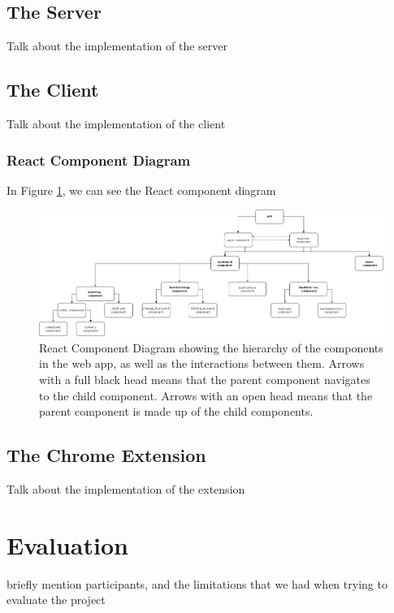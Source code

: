 \documentclass{l4proj}
\begin{document}
\section{The Server}
Talk about the implementation of the server

\section{The Client}
Talk about the implementation of the client

\subsection{React Component Diagram}
In Figure \ref{fig:react}, we can see the React component diagram
\begin{figure}
    \centering
    \includegraphics[width=1\linewidth]{images/react_comp_diagram.png}    

    \caption{React Component Diagram showing the hierarchy of the components in the web app, as well as the interactions between them. Arrows with a full black head means that the parent component navigates to the child component. Arrows with an open head means that the parent component is made up of the child components.}

    \label{fig:react} 
\end{figure}

\section{The Chrome Extension}
Talk about the implementation of the extension


\chapter{Evaluation} 
briefly mention participants, and the limitations that we had when trying to evaluate the project
\end{document}

